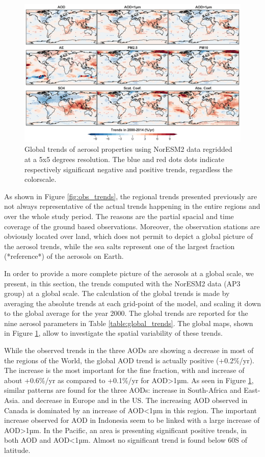 \documentclass[journal abbreviation, manuscript]{copernicus}
\begin{document}
\begin{figure}[t]
 \includegraphics[width=16cm]{../scripts/figs/trends_map2.png}
 \caption{Global trends of aerosol properties using NorESM2 data regridded at a 5x5 degrees resolution. The blue and red dots dots indicate respectively significant negative and positive trends, regardless the colorscale.}
 \label{fig:global_trends}
\end{figure}

As shown in Figure \ref{fig:obs_trends}, the regional trends presented previously are not always representative of the actual trends happening in the entire regions and over the whole study period. The reasons are the partial spacial and time coverage of the ground based observations. Moreover, the observation stations are obviously located over land, which does not permit to depict a global picture of the aerosol trends, while the sea salts represent one of the largest fraction (*reference*) of the aerosols on Earth.

In order to provide a more complete picture of the aerosols at a global scale, we present, in this section, the trends computed with the NorESM2 data (AP3 group) at a global scale. The calculation of the global trends is made by averaging the absolute trends at each grid-point of the model, and scaling it down to the global average for the year 2000. The global trends are reported for the nine aerosol parameters in Table \ref{table:global_trends}. The global maps, shown in Figure \ref{fig:global_trends}, allow to investigate the spatial variability of these trends.

While the observed trends in the three AODs are showing a decrease in most of the regions of the World, the global AOD trend is actually positive (+0.2\%/yr). The increase is the most important for the fine fraction, with and increase of about +0.6\%/yr as compared to +0.1\%/yr for AOD>1µm. As seen in Figure \ref{fig:global_trends}, similar patterns are found for the three AODs: increase in South-Africa and East-Asia. and decrease in Europe and in the US. The increasing AOD observed in Canada is dominated by an increase of AOD<1µm in this region. The important increase observed for AOD in Indonesia seem to be linked with a large increase of AOD>1µm. In the Pacific, an area is presenting significant positive trends, in both AOD and AOD<1µm. Almost no significant trend is found below 60\textdegree S of latitude.
\end{document}
